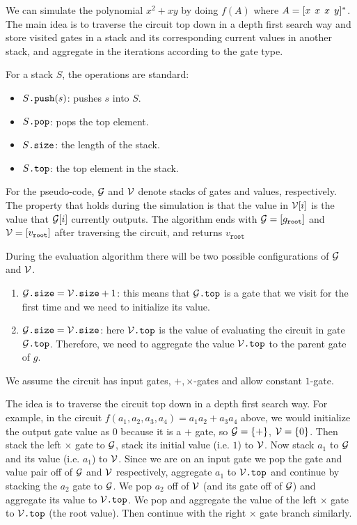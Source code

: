 We can simulate the polynomial $x^2+xy$ by doing $f(A)$ where $A=[x \hspace{1ex} x \hspace{1ex} x \hspace{1ex} y]^*$. The main idea is to traverse the circuit top down in a depth first search way and store visited gates in a stack and its corresponding current values in another stack, and aggregate in the iterations according to the gate type.

For a stack $S$, the operations are standard:

\begin{itemize}
	\item $S\texttt{.push}(s)$: pushes $s$ into $S$.
	\item $S\texttt{.pop}$: pops the top element.
	\item $S\texttt{.size}$: the length of the stack.
	\item $S\texttt{.top}$: the top element in the stack.
\end{itemize}

For the pseudo-code, $\mathcal{G}$ and $\mathcal{V}$ denote stacks of gates and values, respectively. The property that holds during the simulation is that the value in $\mathcal{V}[i]$ is the value that $\mathcal{G}[i]$ currently outputs. The algorithm ends with $\mathcal{G}=\left[ g_{\texttt{root}}\right]$ and $\mathcal{V}=\left[ v_{\texttt{root}}\right]$ after traversing the circuit, and returns $v_{\texttt{root}}$

During the evaluation algorithm there will be two possible configurations of $\mathcal{G}$ and $\mathcal{V}$.

\begin{enumerate}
	\item $\mathcal{G}\texttt{.size} = \mathcal{V}\texttt{.size} + 1$: this means that $\mathcal{G}\texttt{.top}$ is a gate that we visit for the first time and we need to initialize its value.
	
	\item $\mathcal{G}\texttt{.size} = \mathcal{V}\texttt{.size}$: here $\mathcal{V}\texttt{.top}$ is the value of evaluating the circuit in gate $\mathcal{G}\texttt{.top}$. Therefore, we need to aggregate the value $\mathcal{V}\texttt{.top}$ to the parent gate of $g$.
\end{enumerate}

We assume the circuit has input gates, $+, \times$-gates and allow constant $1$-gate.

The idea is to traverse the circuit top down in a depth first search way. For example, in the circuit $f(a_1,a_2,a_3,a_4)=a_1a_2 +a_3a_4$ above, we would initialize the output gate value as $0$ because it is a $+$ gate, so $\mathcal{G}=\lbrace +\rbrace$, $\mathcal{V}=\lbrace 0\rbrace$. Then stack the left $\times$ gate to $\mathcal{G}$, stack its initial value (i.e. $1$) to $\mathcal{V}$. Now stack $a_1$ to $\mathcal{G}$ and its value (i.e. $a_1$) to $\mathcal{V}$. Since we are on an input gate we pop the gate and value pair off of $\mathcal{G}$ and $\mathcal{V}$ respectively, aggregate $a_1$ to $\mathcal{V}\texttt{.top}$ and continue by stacking the $a_2$ gate to $\mathcal{G}$. We pop $a_2$ off of $\mathcal{V}$ (and its gate off of $\mathcal{G}$) and aggregate its value to $\mathcal{V}\texttt{.top}$. We pop and aggregate the value of the left $\times$ gate to $\mathcal{V}\texttt{.top}$ (the root value). Then continue with the right $\times$ gate branch similarly.

